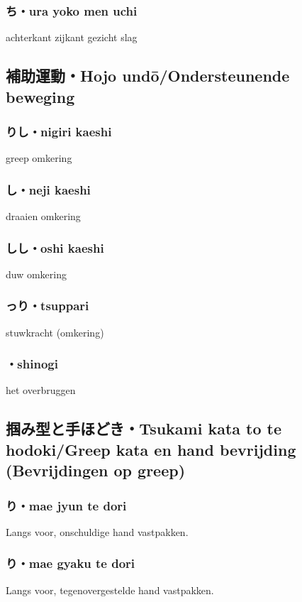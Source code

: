 \subsubsection{ち・ura yoko men uchi}
achterkant zijkant gezicht slag

\subsection{補助運動・Hojo und\={o}/Ondersteunende beweging}
\subsubsection{りし・nigiri kaeshi}
greep omkering

\subsubsection{し・neji kaeshi}
draaien omkering

\subsubsection{しし・oshi kaeshi}
duw omkering

\subsubsection{っり・tsuppari}
stuwkracht (omkering)

\subsubsection{・shinogi}
het overbruggen

\subsection{掴み型と手ほどき・Tsukami kata to te hodoki/Greep kata en hand bevrijding (Bevrijdingen op greep)}
\subsubsection{り・mae jyun te dori}
Langs voor, onschuldige hand vastpakken.

\subsubsection{り・mae gyaku te dori}
Langs voor, tegenovergestelde hand vastpakken.

